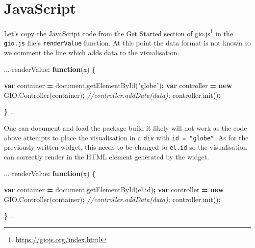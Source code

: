 \documentclass[
]{krantz}
\makeatletter
\newenvironment{Shaded}{\begin{snugshade}}{\end{snugshade}}
\newcommand{\AttributeTok}[1]{\textcolor[rgb]{0.61,0.61,0.61}{#1}}
\newcommand{\CommentTok}[1]{\textcolor[rgb]{0.37,0.37,0.37}{\textit{#1}}}
\newcommand{\KeywordTok}[1]{\textcolor[rgb]{0.27,0.27,0.27}{\textbf{#1}}}
\newcommand{\NormalTok}[1]{#1}
\newcommand{\OperatorTok}[1]{\textcolor[rgb]{0.43,0.43,0.43}{\textbf{#1}}}
\newcommand{\StringTok}[1]{\textcolor[rgb]{0.5,0.5,0.5}{#1}}
\newcommand{\VariableTok}[1]{\textcolor[rgb]{0,0,0}{#1}}
\renewcommand{\href}[2]{#2\footnote{\url{#1}}}
\newenvironment{kframe}{%
\medskip{}
\setlength{\fboxsep}{.8em}
 \def\at@end@of@kframe{}%
 \ifinner\ifhmode%
  \def\at@end@of@kframe{\end{minipage}}%
  \begin{minipage}{\columnwidth}%
 \fi\fi%
 \def\FrameCommand##1{\hskip\@totalleftmargin \hskip-\fboxsep
 \colorbox{shadecolor}{##1}\hskip-\fboxsep
     \hskip-\linewidth \hskip-\@totalleftmargin \hskip\columnwidth}%
 \MakeFramed {\advance\hsize-\width
   \@totalleftmargin\z@ \linewidth\hsize
   \@setminipage}}%
 {\par\unskip\endMakeFramed%
 \at@end@of@kframe}
\renewenvironment{Shaded}{\begin{kframe}}{\end{kframe}}
\makeatother
\begin{document}
\hypertarget{javascript-2}{%
\section*{JavaScript}\label{javascript-2}}


Let's copy the JavaScript code from the \href{https://giojs.org/index.html}{Get Started section of gio.js} in the \texttt{gio.js} file's \texttt{renderValue} function. At this point the data format is not known so we comment the line which adds data to the visualisation.

\begin{Shaded}
\begin{Highlighting}[]
\NormalTok{...}
\NormalTok{renderValue}\OperatorTok{:} \KeywordTok{function}\NormalTok{(x) }\OperatorTok{\{}

  \KeywordTok{var}\NormalTok{ container }\OperatorTok{=} \VariableTok{document}\NormalTok{.}\AttributeTok{getElementById}\NormalTok{(}\StringTok{"globe"}\NormalTok{)}\OperatorTok{;}
  \KeywordTok{var}\NormalTok{ controller }\OperatorTok{=} \KeywordTok{new} \VariableTok{GIO}\NormalTok{.}\AttributeTok{Controller}\NormalTok{(container)}\OperatorTok{;}
  \CommentTok{//controller.addData(data);}
  \VariableTok{controller}\NormalTok{.}\AttributeTok{init}\NormalTok{()}\OperatorTok{;}

\OperatorTok{\}}
\NormalTok{...}
\end{Highlighting}
\end{Shaded}

One can document and load the package build it likely will not work as the code above attempts to place the visualisation in a \texttt{div} with \texttt{id\ =\ "globe"}. As for the previously written widget, this needs to be changed to \texttt{el.id} so the visualisation can correctly render in the HTML element generated by the widget.

\begin{Shaded}
\begin{Highlighting}[]
\NormalTok{...}
\NormalTok{renderValue}\OperatorTok{:} \KeywordTok{function}\NormalTok{(x) }\OperatorTok{\{}

  \KeywordTok{var}\NormalTok{ container }\OperatorTok{=} \VariableTok{document}\NormalTok{.}\AttributeTok{getElementById}\NormalTok{(}\VariableTok{el}\NormalTok{.}\AttributeTok{id}\NormalTok{)}\OperatorTok{;}
  \KeywordTok{var}\NormalTok{ controller }\OperatorTok{=} \KeywordTok{new} \VariableTok{GIO}\NormalTok{.}\AttributeTok{Controller}\NormalTok{(container)}\OperatorTok{;}
  \CommentTok{//controller.addData(data);}
  \VariableTok{controller}\NormalTok{.}\AttributeTok{init}\NormalTok{()}\OperatorTok{;}

\OperatorTok{\}}
\NormalTok{...}
\end{Highlighting}
\end{Shaded}
\end{document}
